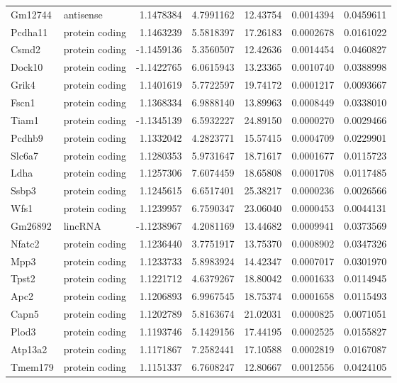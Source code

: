 \documentclass[onehalf,12pt]{beavtex}
\begin{document}
\begin{longtable}{llrrrrr}
  Gm12744 & antisense & 1.1478384 & 4.7991162 & 12.43754 & 0.0014394 & 0.0459611\\
  Pcdha11 & protein coding & 1.1463239 & 5.5818397 & 17.26183 & 0.0002678 & 0.0161022\\
  \addlinespace
  Csmd2 & protein coding & -1.1459136 & 5.3560507 & 12.42636 & 0.0014454 & 0.0460827\\
  Dock10 & protein coding & -1.1422765 & 6.0615943 & 13.23365 & 0.0010740 & 0.0388998\\
  Grik4 & protein coding & 1.1401619 & 5.7722597 & 19.74172 & 0.0001217 & 0.0093667\\
  Fscn1 & protein coding & 1.1368334 & 6.9888140 & 13.89963 & 0.0008449 & 0.0338010\\
  Tiam1 & protein coding & -1.1345139 & 6.5932227 & 24.89150 & 0.0000270 & 0.0029466\\
  \addlinespace
  Pcdhb9 & protein coding & 1.1332042 & 4.2823771 & 15.57415 & 0.0004709 & 0.0229901\\
  Slc6a7 & protein coding & 1.1280353 & 5.9731647 & 18.71617 & 0.0001677 & 0.0115723\\
  Ldha & protein coding & 1.1257306 & 7.6074459 & 18.65808 & 0.0001708 & 0.0117485\\
  Ssbp3 & protein coding & 1.1245615 & 6.6517401 & 25.38217 & 0.0000236 & 0.0026566\\
  Wfs1 & protein coding & 1.1239957 & 6.7590347 & 23.06040 & 0.0000453 & 0.0044131\\
  \addlinespace
  Gm26892 & lincRNA & -1.1238967 & 4.2081169 & 13.44682 & 0.0009941 & 0.0373569\\
  Nfatc2 & protein coding & 1.1236440 & 3.7751917 & 13.75370 & 0.0008902 & 0.0347326\\
  Mpp3 & protein coding & 1.1233733 & 5.8983924 & 14.42347 & 0.0007017 & 0.0301970\\
  Tpst2 & protein coding & 1.1221712 & 4.6379267 & 18.80042 & 0.0001633 & 0.0114945\\
  Apc2 & protein coding & 1.1206893 & 6.9967545 & 18.75374 & 0.0001658 & 0.0115493\\
  \addlinespace
  Capn5 & protein coding & 1.1202789 & 5.8163674 & 21.02031 & 0.0000825 & 0.0071051\\
  Plod3 & protein coding & 1.1193746 & 5.1429156 & 17.44195 & 0.0002525 & 0.0155827\\
  Atp13a2 & protein coding & 1.1171867 & 7.2582441 & 17.10588 & 0.0002819 & 0.0167087\\
  Tmem179 & protein coding & 1.1151337 & 6.7608247 & 12.80667 & 0.0012556 & 0.0424105\\

\end{longtable}
\end{document}

